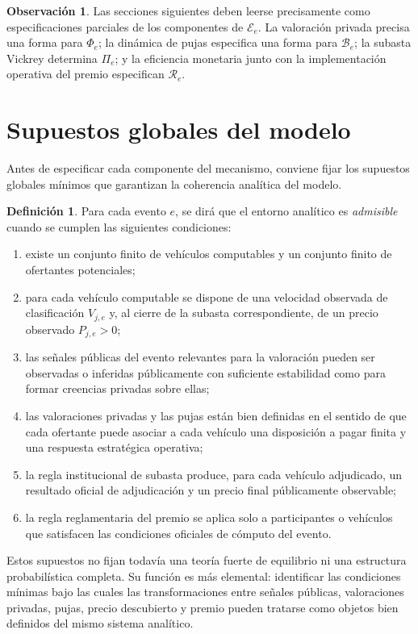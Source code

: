 \documentclass[11pt,a4paper]{article}
\theoremstyle{definition}
\newtheorem{definicion}{Definición}
\newtheorem{observacion}{Observación}
\begin{document}
\begin{observacion}
Las secciones siguientes deben leerse precisamente como especificaciones parciales de los componentes de $\mathcal E_e$. La valoración privada precisa una forma para $\Phi_e$; la dinámica de pujas especifica una forma para $\mathcal B_e$; la subasta Vickrey determina $\Pi_e$; y la eficiencia monetaria junto con la implementación operativa del premio especifican $\mathcal R_e$.
\end{observacion}
\section{Supuestos globales del modelo}

Antes de especificar cada componente del mecanismo, conviene fijar los supuestos globales mínimos que garantizan la coherencia analítica del modelo.

\begin{definicion}
Para cada evento $e$, se dirá que el entorno analítico es \emph{admisible} cuando se cumplen las siguientes condiciones:
\begin{enumerate}
    \item existe un conjunto finito de vehículos computables y un conjunto finito de ofertantes potenciales;
    \item para cada vehículo computable se dispone de una velocidad observada de clasificación $V_{j,e}$ y, al cierre de la subasta correspondiente, de un precio observado $P_{j,e}>0$;
    \item las señales públicas del evento relevantes para la valoración pueden ser observadas o inferidas públicamente con suficiente estabilidad como para formar creencias privadas sobre ellas;
    \item las valoraciones privadas y las pujas están bien definidas en el sentido de que cada ofertante puede asociar a cada vehículo una disposición a pagar finita y una respuesta estratégica operativa;
    \item la regla institucional de subasta produce, para cada vehículo adjudicado, un resultado oficial de adjudicación y un precio final públicamente observable;
    \item la regla reglamentaria del premio se aplica solo a participantes o vehículos que satisfacen las condiciones oficiales de cómputo del evento.
\end{enumerate}
\end{definicion}

Estos supuestos no fijan todavía una teoría fuerte de equilibrio ni una estructura probabilística completa. Su función es más elemental: identificar las condiciones mínimas bajo las cuales las transformaciones entre señales públicas, valoraciones privadas, pujas, precio descubierto y premio pueden tratarse como objetos bien definidos del mismo sistema analítico.
\end{document}
